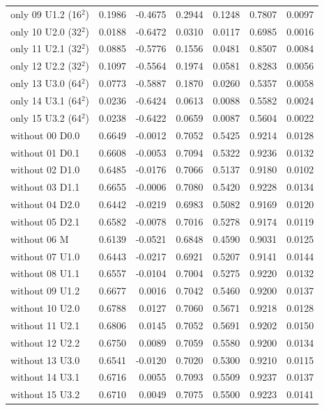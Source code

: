 {\begin{longtable}{>{\raggedright\arraybackslash}p{3.73cm}rrrrrr}
only 09 U1.2 (16$^2$) & 0.1986 & -0.4675 & 0.2944 & 0.1248 & 0.7807 & 0.0097 \\
only 10 U2.0 (32$^2$) & 0.0188 & -0.6472 & 0.0310 & 0.0117 & 0.6985 & 0.0016 \\
only 11 U2.1 (32$^2$) & 0.0885 & -0.5776 & 0.1556 & 0.0481 & 0.8507 & 0.0084 \\
only 12 U2.2 (32$^2$) & 0.1097 & -0.5564 & 0.1974 & 0.0581 & 0.8283 & 0.0056 \\
only 13 U3.0 (64$^2$) & 0.0773 & -0.5887 & 0.1870 & 0.0260 & 0.5357 & 0.0058 \\
only 14 U3.1 (64$^2$) & 0.0236 & -0.6424 & 0.0613 & 0.0088 & 0.5582 & 0.0024 \\
only 15 U3.2 (64$^2$) & 0.0238 & -0.6422 & 0.0659 & 0.0087 & 0.5604 & 0.0022 \\
without 00 D0.0 & 0.6649 & -0.0012 & 0.7052 & 0.5425 & 0.9214 & 0.0128 \\
without 01 D0.1 & 0.6608 & -0.0053 & 0.7094 & 0.5322 & 0.9236 & 0.0132 \\
without 02 D1.0 & 0.6485 & -0.0176 & 0.7066 & 0.5137 & 0.9180 & 0.0102 \\
without 03 D1.1 & 0.6655 & -0.0006 & 0.7080 & 0.5420 & 0.9228 & 0.0134 \\
without 04 D2.0 & 0.6442 & -0.0219 & 0.6983 & 0.5082 & 0.9169 & 0.0120 \\
without 05 D2.1 & 0.6582 & -0.0078 & 0.7016 & 0.5278 & 0.9174 & 0.0119 \\
without 06 M & 0.6139 & -0.0521 & 0.6848 & 0.4590 & 0.9031 & 0.0125 \\
without 07 U1.0 & 0.6443 & -0.0217 & 0.6921 & 0.5207 & 0.9141 & 0.0144 \\
without 08 U1.1 & 0.6557 & -0.0104 & 0.7004 & 0.5275 & 0.9220 & 0.0132 \\
without 09 U1.2 & 0.6677 & 0.0016 & 0.7042 & 0.5460 & 0.9200 & 0.0137 \\
without 10 U2.0 & 0.6788 & 0.0127 & 0.7060 & 0.5671 & 0.9218 & 0.0128 \\
without 11 U2.1 & 0.6806 & 0.0145 & 0.7052 & 0.5691 & 0.9202 & 0.0150 \\
without 12 U2.2 & 0.6750 & 0.0089 & 0.7059 & 0.5580 & 0.9200 & 0.0134 \\
without 13 U3.0 & 0.6541 & -0.0120 & 0.7020 & 0.5300 & 0.9210 & 0.0115 \\
without 14 U3.1 & 0.6716 & 0.0055 & 0.7093 & 0.5509 & 0.9237 & 0.0137 \\
without 15 U3.2 & 0.6710 & 0.0049 & 0.7075 & 0.5500 & 0.9223 & 0.0141 \\
\bottomrule
\end{longtable}}
